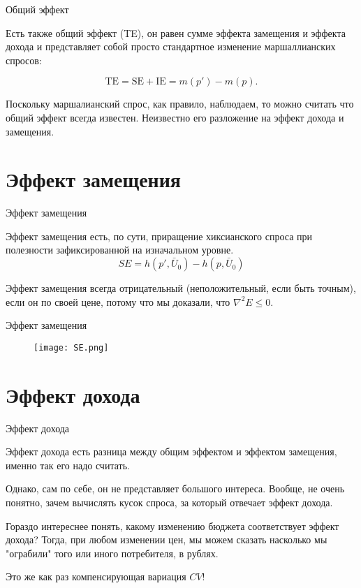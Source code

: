 \documentclass{beamer}
\begin{document}
\begin{frame}{Общий эффект}

Есть также общий эффект (TE), он равен сумме эффекта замещения и эффекта дохода и представляет собой просто стандартное изменение маршаллианских спросов:

$$ \text{TE} = \text{SE} + \text{IE} = m(p') - m(p).$$

Поскольку маршалианский спрос, как правило, наблюдаем, то можно считать что общий эффект всегда известен. Неизвестно его разложение на эффект дохода и замещения.

\end{frame}

\section{Эффект замещения}

\begin{frame}{Эффект замещения}

Эффект замещения есть, по сути, приращение хиксианского спроса при полезности зафиксированной на изначальном уровне. 
$$ SE = h(p', \bar U_0) - h(p, \bar U_0) $$

Эффект замещения всегда отрицательный (неположительный, если быть точным), если он по своей цене, потому что мы доказали, что $\nabla^2 E \leqslant 0$.

\end{frame}

\begin{frame}{Эффект замещения}

\begin{figure}[hbt]
\centering
\texttt{[image: SE.png]}
\end{figure}

\end{frame}

\section{Эффект дохода}

\begin{frame}{Эффект дохода}

Эффект дохода есть разница между общим эффектом и эффектом замещения, именно так его надо считать. 

Однако, сам по себе, он не представляет большого интереса. Вообще, не очень понятно, зачем вычислять кусок спроса, за который отвечает эффект дохода. 

Гораздо интереснее понять, какому изменению бюджета соответствует эффект дохода? Тогда, при любом изменении цен, мы можем сказать насколько мы "ограбили" того или иного потребителя, в рублях.

Это же как раз компенсирующая вариация $CV$!

\end{frame}
\end{document}

